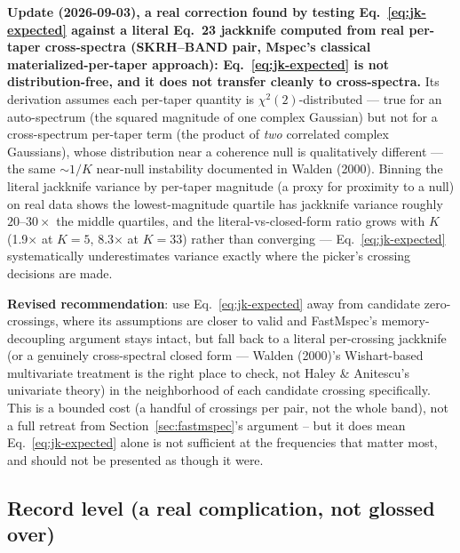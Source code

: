 \documentclass[11pt]{article}
\begin{document}
\textbf{Update (2026-09-03), a real correction found by testing Eq.~\ref{eq:jk-expected} against
a literal Eq.~23 jackknife computed from real per-taper cross-spectra (SKRH--BAND pair, Mspec's
classical materialized-per-taper approach): Eq.~\ref{eq:jk-expected} is not distribution-free,
and it does not transfer cleanly to cross-spectra.} Its derivation assumes each per-taper
quantity is $\chi^2(2)$-distributed --- true for an auto-spectrum (the squared magnitude of one
complex Gaussian) but not for a cross-spectrum per-taper term (the product of \emph{two}
correlated complex Gaussians), whose distribution near a coherence null is qualitatively
different --- the same $\sim 1/K$ near-null instability documented in Walden (2000). Binning
the literal jackknife variance by per-taper magnitude (a proxy for proximity to a null) on real
data shows the lowest-magnitude quartile has jackknife variance roughly $20$--$30\times$ the
middle quartiles, and the literal-vs-closed-form ratio grows with $K$ (1.9$\times$ at $K=5$,
8.3$\times$ at $K=33$) rather than converging --- Eq.~\ref{eq:jk-expected} systematically
underestimates variance exactly where the picker's crossing decisions are made.

\textbf{Revised recommendation}: use Eq.~\ref{eq:jk-expected} away from candidate zero-crossings,
where its assumptions are closer to valid and FastMspec's memory-decoupling argument stays
intact, but fall back to a literal per-crossing jackknife (or a genuinely cross-spectral closed
form --- Walden (2000)'s Wishart-based multivariate treatment \cite{walden2000} is the right
place to check, not Haley \& Anitescu's univariate theory) in the neighborhood of each candidate
crossing specifically. This is a bounded cost (a handful of crossings per pair, not the whole
band), not a full retreat from Section~\ref{sec:fastmspec}'s argument -- but it does mean
Eq.~\ref{eq:jk-expected} alone is not sufficient at the frequencies that matter most, and should
not be presented as though it were.

\subsection{Record level (a real complication, not glossed over)}
\end{document}

